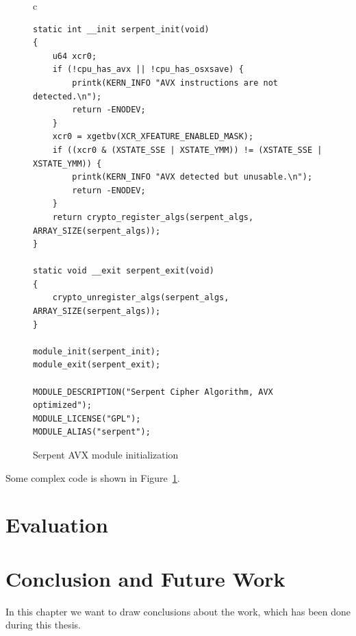 \documentclass[10pt,twoside,a4paper,bibliography=totoc]{scrbook}
\makeatletter
\def\cleardoublepage{\clearpage\if@twoside \ifodd\c@page\else
  \hbox{}
  \thispagestyle{plain}
  \newpage
  \if@twocolumn\hbox{}\newpage\fi\fi\fi}
\makeatother
\begin{document}
\Blindtext[5][2]

\begin{figure}
\centering
\begin{tabular}{c}
\begin{lstlisting}
static int __init serpent_init(void)
{
    u64 xcr0;
    if (!cpu_has_avx || !cpu_has_osxsave) {
        printk(KERN_INFO "AVX instructions are not detected.\n");
        return -ENODEV;
    }
    xcr0 = xgetbv(XCR_XFEATURE_ENABLED_MASK);
    if ((xcr0 & (XSTATE_SSE | XSTATE_YMM)) != (XSTATE_SSE | XSTATE_YMM)) {
        printk(KERN_INFO "AVX detected but unusable.\n");
        return -ENODEV;
    }
    return crypto_register_algs(serpent_algs, ARRAY_SIZE(serpent_algs));
}

static void __exit serpent_exit(void)
{
    crypto_unregister_algs(serpent_algs, ARRAY_SIZE(serpent_algs));
}

module_init(serpent_init);
module_exit(serpent_exit);

MODULE_DESCRIPTION("Serpent Cipher Algorithm, AVX optimized");
MODULE_LICENSE("GPL");
MODULE_ALIAS("serpent");
\end{lstlisting}
\end{tabular}
\caption{Serpent AVX module initialization}
\label{fig:serpent_init}
\end{figure}

Some complex code is shown in Figure~\ref{fig:serpent_init}. \blindtext



%
% 


\chapter{Evaluation}
\label{sec:evaluation}

\Blindtext[5][1]



\fancyhead[RE]{\leftmark}
%
% 


\chapter{Conclusion and Future Work}
\label{sec:conclusion_and_future_work}

In this chapter we want to draw conclusions about the work, which has been done
during this thesis. \blindtext


\fancyhead[RE]{\rightmark}


%


\cleardoublepage
\end{document}
